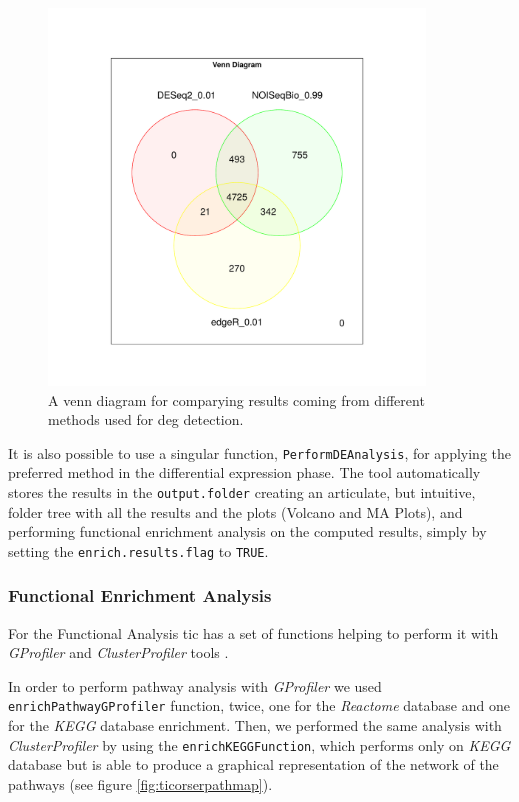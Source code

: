\begin{figure}[H]
\centering
\includegraphics[width=10cm, keepaspectratio]{img/ticorser/de/singleTP/venn.pdf}
\caption[ticorser venn diagram single time point]{A venn diagram for comparying results coming from different methods used for \gls{deg} detection.}
\label{fig:ticorsertpvenn}
\end{figure}

It is also possible to use a singular function, \lstinline!PerformDEAnalysis!, for applying the preferred method in the differential expression phase. 
The tool automatically stores the results in the \lstinline!output.folder! creating an articulate, but intuitive, folder tree with all the results and the plots (Volcano and MA Plots), and performing functional enrichment analysis on the computed results, simply by setting the \lstinline!enrich.results.flag! to \lstinline!TRUE!.

\subsubsection{Functional Enrichment Analysis}

For the Functional Analysis \gls{tic} has a set of functions helping to perform it with \textit{GProfiler} and \textit{ClusterProfiler} tools \cite{Yu2012, Reimand2016}.

In order to perform pathway analysis with \textit{GProfiler} we used \lstinline!enrichPathwayGProfiler! function, twice, one for the \textit{Reactome} database and one for the \textit{KEGG} database enrichment.
Then, we performed the same analysis with \textit{ClusterProfiler} by using the \lstinline!enrichKEGGFunction!, which performs only on \textit{KEGG} database but is able to produce a graphical representation of the network of the pathways (see figure \ref{fig:ticorserpathmap}).

